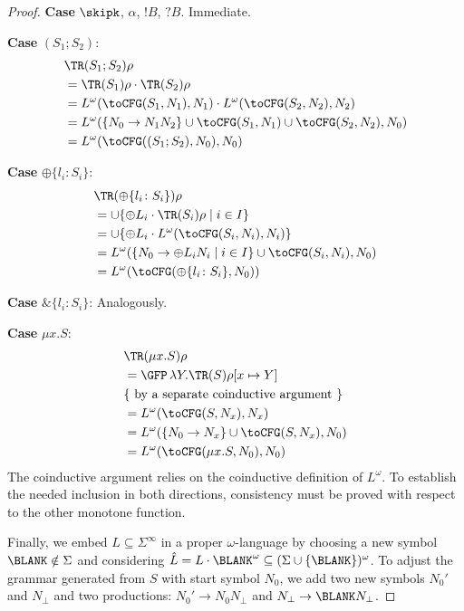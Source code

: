 \begin{proof}
  \textbf{Case }$\skipk$, $\alpha$, $!B$, $?B$. Immediate.

  \textbf{Case }$(S_1;S_2)$:
  \begin{align*}
    & \TR (S_1;S_2)\rho \\
    &= \TR (S_1)\rho \cdot \TR (S_2)\rho \\
    &= L^\omega (\toCFG (S_1, N_1), N_1) \cdot L^\omega( \toCFG (S_2, N_2), N_2) \\
    & = L^\omega (\{ N_0 \to N_1N_2\} \cup \toCFG (S_1, N_1) \cup \toCFG (S_2, N_2), N_0) \\
    & = L^\omega (\toCFG ((S_1; S_2), N_0), N_0)
  \end{align*}

  \textbf{Case }$\oplus\{l_i\colon S_i\}$:
  \begin{align*}
    & \TR (\oplus\{l_i\colon S_i\})\rho \\
    & =  {\cup} \{  {\oplus L_i} \cdot \TR (S_i)\rho \mid {i\in I} \} \\
    & =  {\cup} \{  {\oplus L_i} \cdot L^\omega (\toCFG(S_i, N_i), N_i) \} \\
    & =  L^\omega (\{ N_0 \to {\oplus L_i} N_i \mid i\in I \} \cup \toCFG (S_i, N_i), N_0) \\
    & = L^\omega (\toCFG (\oplus\{l_i\colon S_i\}, N_0))
  \end{align*}

  \textbf{Case }$\&\{l_i\colon S_i\}$: Analogously.

  \textbf{Case }$\mu x.S$:
  \begin{align*}
    & \TR (\mu x.S)\rho \\
    &= \GFP\, \lambda Y. \TR (S)\rho[x\mapsto Y] \\
    & \{ \text{ by a separate coinductive argument } \} \\
    &= L^\omega (\toCFG (S, N_x) , N_x)\\
    &= L^\omega (\{ N_0 \to N_x \} \cup \toCFG (S, N_x) , N_0)\\
    &= L^\omega (\toCFG (\mu x.S, N_0), N_0)
  \end{align*}
  The coinductive argument relies on the coinductive definition of $L^\omega$.
  To establish the needed inclusion in both directions, consistency must be proved with respect to
  the other monotone function.

  Finally, we embed $L \subseteq \Sigma^\infty$ in a proper $\omega$-language by choosing a new
  symbol $\BLANK \notin \Sigma$  and considering $\hat{L} = L \cdot \BLANK^\omega \subseteq
  (\Sigma\cup\{\BLANK\})^\omega$. To adjust the grammar generated from $S$ with start symbol $N_0$,
  we add two new symbols $N_0'$ and $N_\bot$ and two productions: $N_0' \to N_0N_\bot$ and $N_\bot
  \to \BLANK N_\bot$.
\end{proof}

